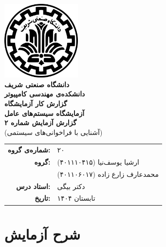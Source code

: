 \documentclass[12pt]{article}
\newcommand{\persianordinal}[1]{%
	\ifcase#1
	\or اول%
	\or دوم%
	\or سوم%
	\or چهارم%
	\or پنجم%
	\or ششم%
	\or هفتم%
	\or هشتم%
	\or نهم%
	\or دهم%
	\or یازدهم%
	\or دوازدهم%
	\or سیزدهم%
	\or چهاردهم%
	\or پانزدهم%
	\or شانزدهم%
	\or هفدهم%
	\or هجدهم%
	\or نوزدهم%
	\or بیستم%
	\else #1\fi
}
\newcommand{\persianordinalpage}{\persianfont\persianordinal{\value{page}}}
\begin{document}
	
	\begin{titlepage}
		\centering
		\vspace*{1cm}
		\includegraphics[width=4cm]{sharif.png}\\[1.5cm]
		{\Large\textbf{دانشگاه صنعتی شریف}}\\[0.5cm]
		{\large\textbf{دانشکده‌ی مهندسی کامپیوتر}}\\[1.5cm]
		{\Huge\textbf{گزارش کار آزمایشگاه}}\\[0.5cm]
		{\LARGE\textbf{آزمایشگاه سیستم‌های عامل}}\\[2cm]
		
		\textbf{گزارش آزمایش شماره ۲}\\
		(آشنایی با فراخوانی‌های سیستمی)
		
		\vfill
		\begin{tabular}{rl}
			\textbf{شماره‌ی گروه:} & ۲۰ \\
			\textbf{گروه:} &
			ارشیا یوسف‌نیا (۴۰۱۱۱۰۴۱۵) \\
			& محمدعارف زارع زاده (۴۰۱۱۰۶۰۱۷) \\
			\textbf{استاد درس:} & دکتر بیگی \\
			\textbf{تاریخ:} & تابستان ۱۴۰۴ \\
		\end{tabular}
	\end{titlepage}
	
	\clearpage
	\setcounter{page}{1}
	\renewcommand{\thepage}{\persianordinalpage}
	
	\tableofcontents
	\clearpage
	\listoffigures
	\clearpage
	\listoftables
	
	\clearpage
	\setcounter{page}{1}
	\renewcommand{\thepage}{\persianfont\arabic{page}}
	
	
        \section{شرح آزمایش}
\end{document}
